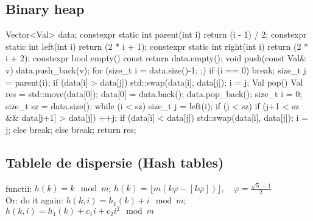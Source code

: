 \documentclass[11pt,a4paper]{report}
\begin{document}
\subsection*{Binary heap}
\begin{cpp}
Vector<Val> data;
constexpr static int parent(int i) { return (i - 1) / 2; }
constexpr static int left(int i) { return (2 * i + 1); }
constexpr static int right(int i) { return (2 * i + 2); }
constexpr bool empty() const { return data.empty(); }
void push(const Val& v) {
    data.push_back(v);
    for (size_t i = data.size()-1; ;) {
        if (i == 0) break;
        size_t j = parent(i);
        if (data[i] > data[j]) {
            std::swap(data[i], data[j]);
            i = j;
        }
    }
}
Val pop() {
    Val res = std::move(data[0]);
    data[0] = data.back();
    data.pop_back();
    size_t i = 0;
    size_t sz = data.size();
    while (i < sz) {
        size_t j = left(i);
        if (j < sz) {
            if (j+1 < sz && data[j+1] > data[j]) ++j;
            if (data[i] < data[j]) {
                std::swap(data[i], data[j]);
                i = j;
            } else break;
        } else break;
    }
    return res;
}
\end{cpp}
\subsection*{Tablele de dispersie (Hash tables)}
functii: $h(k) = k \mod m $; \quad \quad
$h(k) = \lfloor m(k \varphi - [k\varphi]) \rfloor,\quad \varphi = \frac{\sqrt{5} - 1}{2}$\\
Or: do it again: $h(k, i) = h_1(k)+i \mod m$; \quad \quad
$h(k, i) = h_1(k)+c_1 i + c_2 i^2 \mod m$
\end{document}
